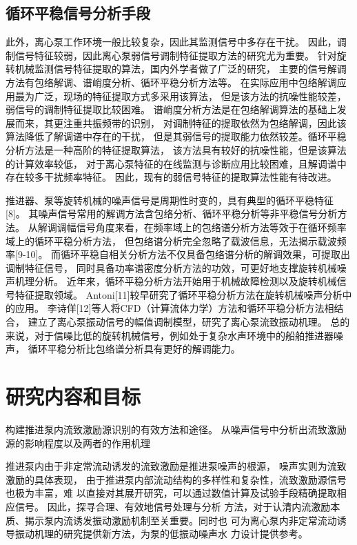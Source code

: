\subsection{循环平稳信号分析手段}
此外，离心泵工作环境一般比较复杂，因此其监测信号中多存在干扰。
因此，调制信号特征较弱，因此离心泵弱信号调制特征提取方法的研究尤为重要。
针对旋转机械监测信号特征提取的算法，国内外学者做了广泛的研究，
主要的信号解调方法有包络解调、谱峭度分析、循环平稳分析方法等。
在实际应用中包络解调应用最为广泛，现场的特征提取方式多采用该算法，
但是该方法的抗噪性能较差，弱信号的调制特征提取比较困难。
谱峭度分析方法是在包络解调算法的基础上发展而来，其更注重共振频带的识别，
对调制特征的提取依然为包络解调，因此该算法降低了解调谱中存在的干扰，
但是其弱信号的提取能力依然较差。循环平稳分析方法是一种高阶的特征提取算法，
该方法具有较好的抗噪性能，但是该算法的计算效率较低，
对于离心泵特征的在线监测与诊断应用比较困难，且解调谱中存在较多干扰频率特征。
因此，现有的弱信号特征的提取算法性能有待改进。

推进器、泵等旋转机械的噪声信号是周期性时变的，具有典型的循环平稳特征[8]。
其噪声信号常用的解调方法含包络分析、循环平稳分析等非平稳信号分析方法。
从解调调幅信号角度来看，在频率域上的包络谱分析方法等效于在循环频率域上的循环平稳分析方法，
但包络谱分析完全忽略了载波信息，无法揭示载波频率[9-10]。
而循环平稳自相关分析方法不仅具备包络谱分析的解调效果，可提取出调制特征信号，
同时具备功率谱密度分析方法的功效，可更好地支撑旋转机械噪声机理分析。
近年来，循环平稳分析方法开始用于机械故障检测以及旋转机械信号特征提取领域。
Antoni[11]较早研究了循环平稳分析方法在旋转机械噪声分析中的应用。
李诗佯[12]等人将CFD（计算流体力学）方法和循环平稳分析方法相结合，
建立了离心泵振动信号的幅值调制模型，研究了离心泵流致振动机理。
总的来说，对于信噪比低的旋转机械信号，例如处于复杂水声环境中的船舶推进器噪声，
循环平稳分析比包络谱分析具有更好的解调能力。

\section{研究内容和目标}
构建推进泵内流致激励源识别的有效方法和途径。
从噪声信号中分析出流致激励源的影响程度以及两者的作用机理

推进泵内由于非定常流动诱发的流致激励是推进泵噪声的根源，
噪声实则为流致激励的具体表现，
由于推进泵内部流动结构的多样性和复杂性，流致激励源信号也极为丰富，难
以直接对其展开研究，可以通过数值计算及试验手段精确提取相应信号。
因此，探寻合理、有效地信号处理与分析
方法，对于认清内流激励本质、揭示泵内流诱发振动激励机制至关重要。同时也
可为离心泵内非定常流动诱导振动机理的研究提供新方法，为泵的低振动噪声水
力设计提供参考。

